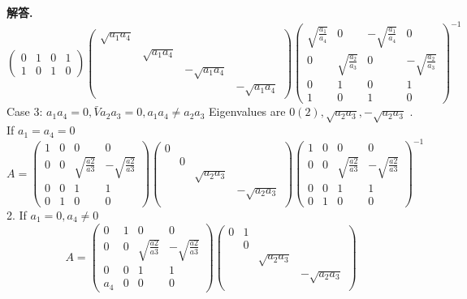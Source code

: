 \documentclass[10pt, a4paper, oneside]{article}
\newenvironment{solution}{\par\noindent\textbf{解答. }}{\par}
\begin{document}
\begin{CJK}{UTF8}{gbsn}
\begin{solution}
$$\begin{pmatrix}
    0 & 1 & 0 & 1 \\ 
    1 & 0 & 1 & 0
  \end{pmatrix} \begin{pmatrix}
    \sqrt{a_1a_4} \\ & \sqrt{a_1a_4}  \\ && -\sqrt{a_1a_4}  \\ &&& -\sqrt{a_1a_4} 
  \end{pmatrix} \begin{pmatrix}
    \sqrt{\frac{a_1}{a_4}} & 0 & -  \sqrt{\frac{a_1}{a_4}} & 0 \\
    0 & \sqrt{\frac{a_2}{a_3}} & 0 & -\sqrt{\frac{a_2}{a_3}} \\ 
    0 & 1 & 0 & 1 \\ 
    1 & 0 & 1 & 0
  \end{pmatrix}^{-1}$$ 
  Case 3: $a_1a_4=0, \bar{V}a_2a_3 = 0, a_1a_4\neq a_2a_3$ \newline
  Eigenvalues are $0(2), \sqrt{a_2a_3}, -\sqrt{a_2a_3}$ . If $a_1=a_4 = 0$ 
  $$ A = \begin{pmatrix}
    1 & 0 & 0 & 0 \\
    0 & 0 & \sqrt{\frac{a2}{a3}} & -\sqrt{\frac{a2}{a3}} \\
    0 & 0 & 1 & 1 \\
    0 & 1 & 0 & 0
  \end{pmatrix} \begin{pmatrix}
    0 \\ &0 \\ && \sqrt{a_2a_3} \\ &&& -\sqrt{a_2a_3} \\
  \end{pmatrix} \begin{pmatrix}
    1 & 0 & 0 & 0 \\
    0 & 0 & \sqrt{\frac{a2}{a3}} & -\sqrt{\frac{a2}{a3}} \\
    0 & 0 & 1 & 1 \\
    0 & 1 & 0 & 0
  \end{pmatrix}^{-1}$$
  2. If $a_1=0,a_4\neq 0$ 
  $$ A = \begin{pmatrix}
    0 & 1 & 0 & 0 \\
    0 & 0 & \sqrt{\frac{a2}{a3}} & -\sqrt{\frac{a2}{a3}} \\
    0 & 0 & 1 & 1 \\
    a_4 & 0 & 0 & 0
  \end{pmatrix} \begin{pmatrix}
    0 & 1 \\ &0 \\ && \sqrt{a_2a_3} \\ &&& -\sqrt{a_2a_3} \\

\end{pmatrix}$$
\end{solution}
\end{CJK}
\end{document}
